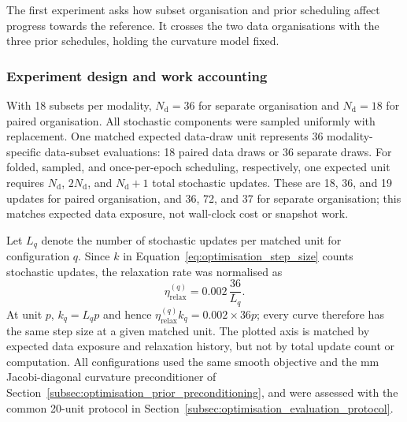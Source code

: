 The first experiment asks how subset organisation and prior scheduling affect progress towards the reference. It crosses the two data organisations with the three prior schedules, holding the curvature model fixed.

\subsubsection{Experiment design and work accounting}
\label{subsec:subset_selection_experiment_methods}

With 18 subsets per modality, $N_{\mathrm d}=36$ for separate organisation and $N_{\mathrm d}=18$ for paired organisation. All stochastic components were sampled uniformly with replacement. One matched expected data-draw unit represents 36 modality-specific data-subset evaluations: 18 paired data draws or 36 separate draws. For folded, sampled, and once-per-epoch scheduling, respectively, one expected unit requires $N_{\mathrm d}$, $2N_{\mathrm d}$, and $N_{\mathrm d}+1$ total stochastic updates. These are 18, 36, and 19 updates for paired organisation, and 36, 72, and 37 for separate organisation; this matches expected data exposure, not wall-clock cost or snapshot work.

Let $L_q$ denote the number of stochastic updates per matched unit for configuration $q$. Since $k$ in Equation~\eqref{eq:optimisation_step_size} counts stochastic updates, the relaxation rate was normalised as
\[
    \eta_{\mathrm{relax}}^{(q)}
    =0.002\,\frac{36}{L_q}.
\]
At unit $p$, $k_q=L_qp$ and hence $\eta_{\mathrm{relax}}^{(q)}k_q=0.002\times36p$; every curve therefore has the same step size at a given matched unit. The plotted axis is matched by expected data exposure and relaxation history, but not by total update count or computation. All configurations used the same smooth objective and the \gls{mm} Jacobi-diagonal curvature preconditioner of Section~\ref{subsec:optimisation_prior_preconditioning}, and were assessed with the common 20-unit protocol in Section~\ref{subsec:optimisation_evaluation_protocol}.

